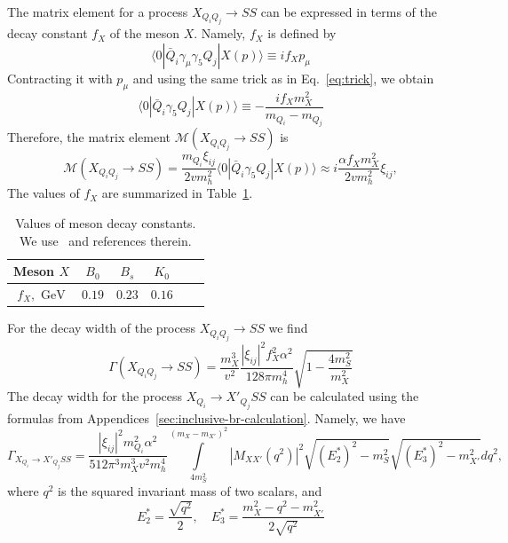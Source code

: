 \documentclass[a4paper,12pt,dvipsnames,usernames]{article}
\begin{document}
The matrix element for a process $X_{Q_{i}Q_{j}} \to SS$ can be expressed in terms of the decay constant $f_{X}$ of the meson $X$. Namely, $f_{X}$ is defined by
\begin{equation}
    \langle 0|\bar{Q}_{i}\gamma_{\mu}\gamma_{5}Q_{j} |X(p)\rangle \equiv if_{X}p_{\mu}
\end{equation}
Contracting it with $p_{\mu}$ and using the same trick as in Eq.~\eqref{eq:trick}, we obtain
\begin{equation}
    \langle 0|\bar{Q}_{i}\gamma_{5}Q_{j} |X(p)\rangle \equiv -\frac{if_{X}m_{X}^{2}}{m_{Q_{i}} - m_{Q_{j}}}
\end{equation}
Therefore, the matrix element $\mathcal{M}(X_{Q_{i}Q_{j}} \to SS)$ is
\begin{equation}
    \mathcal{M}(X_{Q_{i}Q_{j}} \to SS)= \frac{m_{Q_{i}}\xi_{ij}}{2v m_{h}^{2}} \langle 0|\bar{Q}_{i}\gamma_{5}Q_{j} |X(p)\rangle \approx i\frac{\alpha f_{X}m_{X}^{2}}{2v m_{h}^{2}}\xi_{ij},
\end{equation}
The values of $f_{X}$ are summarized in Table~\ref{tab:meson-decay-constants}.
\begin{table}[]
    \centering
    \begin{tabular}{|c|c|c|c|c|c|}
    \hline    
    Meson $X$ & $B_{0}$ & $B_{s}$ & $K_{0}$ \\
    \hline
    $f_{X},\text{ GeV}$ & $0.19$ & $0.23$ & $0.16$ \\
    \hline
    \end{tabular}
    \caption{Values of meson decay constants. We use~\cite{Chang:2018aut} and references therein.}
    \label{tab:meson-decay-constants}
\end{table}
For the decay width of the process $X_{Q_{i}Q_{j}} \to SS$ we find
\begin{equation}
    \Gamma (X_{Q_{i}Q_{j}}\to SS) = \frac{m_{X}^3}{v^2} \frac{|\xi_{ij}|^2 f_{X}^2 \alpha^2}{128\pi m_h^4}\sqrt{1-\frac{4m_{S}^{2}}{m_{X}^{2}}}
    \label{eq:bstossbranching}
\end{equation}
The decay width for the process $X_{Q_{i}} \to X'_{Q_{j}}SS$ can be calculated using the formulas from Appendices~\ref{sec:inclusive-br-calculation}. Namely, we have
\begin{equation}
   \Gamma_{X_{Q_{i}} \to X'_{Q_{j}}SS} = \frac{|\xi_{ij}|^{2}m_{Q_{i}}^{2}\alpha^{2}}{512\pi^{3}m_{X}^{3}v^{2}m_{h}^{4}}\int \limits_{4m_{S}^{2}}^{(m_{X}-m_{X'})^{2}} |M_{XX'}(q^{2})|^{2}\sqrt{(E_{2}^{*})^{2}-m_{S}^{2}}\sqrt{(E_{3}^{*})^{2}-m_{X'}^{2}}dq^{2},
   \label{eq:br-quartic-3-body}
\end{equation}
where $q^{2}$ is the squared invariant mass of two scalars, and
\begin{equation}
   E_{2}^{*} =\frac{\sqrt{q^{2}}}{2}, \quad E_{3}^{*} = \frac{m_{X}^{2}-q^{2}-m_{X'}^{2}}{2\sqrt{q^{2}}}
\end{equation}
\end{document}
